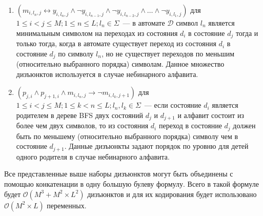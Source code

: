 \begin{enumerate}
  \item $\left(m_{i,l_{n},j} \leftrightarrow y_{i,l_{n},j} \wedge \neg y_{i,l_{n - 1}, j} \wedge \neg y_{i,l_{n - 2}, j} \wedge \ldots \wedge \neg y_{i,l_{1},j} \right)$ для $1 \leq i < j \leq M; 1 \leq n \leq L;l_{n} \in \Sigma$~{---} в автомате $\mathcal{D}$ символ $l_{n}$ является минимальным символом на переходах из состояния $d_{i}$ в состояние $d_{j}$ тогда и только тогда, когда в автомате существует переход из состояния $d_{i}$ в состояние $d_{j}$ по символу $l_{n}$, но не существует переходов по меньшим (относительно выбранного порядка) символам.
  Данное множество дизъюнктов используется в случае небинарного алфавита.

  \item $\left(p_{j,i} \wedge p_{j + 1, i} \wedge m_{i,l_{n}, j} \rightarrow \neg m_{i, l_{k}, j + 1}\right)$ для $1 \leq i < j \leq M; 1 \leq k < n \leq L;l_n,l_k \in \Sigma$~{---} если состояние $d_{i}$ является родителем в дереве BFS двух состояний $d_{j}$ и $d_{j + 1}$ и алфавит состоит из более чем двух символов, то из состояния $d_{i}$ переход в состояние $d_{j}$ должен быть по меньшему (относительно выбранного порядка) символу чем в состояние $d_{j + 1}$.
  Данные дизъюнкты задают порядок по уровню для детей одного родителя в случае небинарного алфавита.
\end{enumerate}

Все представленные выше наборы дизъюнктов могут быть объединены с помощью конкатенации в одну большую булеву формулу. Всего в такой формуле будет $\mathcal{O}(M^{3} + M^{2} \times L^{2})$ дизъюнктов и для их кодирования будет использовано $\mathcal{O}(M^2 \times L)$ переменных.

